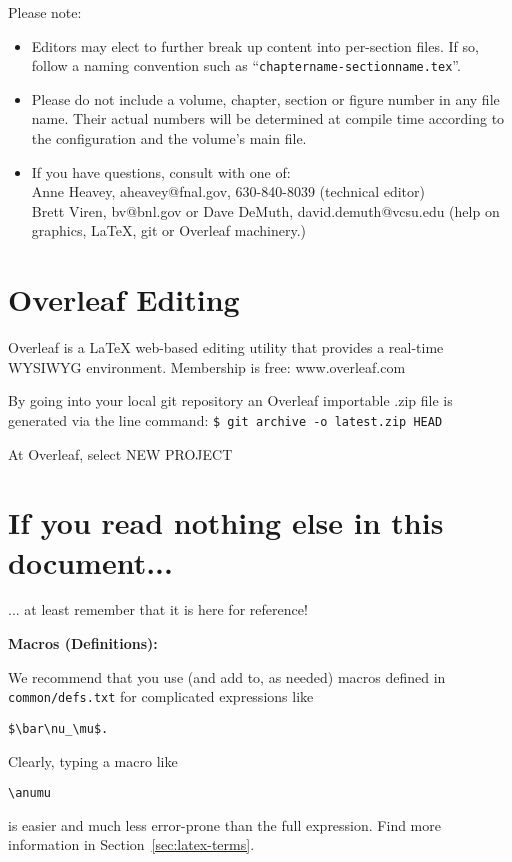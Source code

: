 Please note:
\begin{itemize}
\item Editors may elect to further break up content into per-section files. If so, follow a naming convention such as ``\texttt{chaptername-sectionname.tex}''.
\item Please do not include a volume, chapter, section or figure number in any file name. Their actual numbers will be determined at compile time according to the configuration and the volume's main file. 
\item If you have questions, consult with one of: \\
  Anne Heavey, aheavey@fnal.gov, 630-840-8039 (technical editor)\\
  Brett Viren, bv@bnl.gov or Dave DeMuth, david.demuth@vcsu.edu (help on graphics, \LaTeX{}, git or Overleaf machinery.)
\end{itemize}

\section{Overleaf Editing}
\label{sec:gen-overleaf}

Overleaf is a \LaTeX{} web-based editing utility that provides a real-time WYSIWYG environment. Membership is free: www.overleaf.com

By going into your local git repository an Overleaf importable .zip file is generated via the line command: \texttt{\$ git archive -o latest.zip HEAD}

At Overleaf, select NEW PROJECT

\section{If you read nothing else in this document...}
\label{sec:gen-nothing}

... at least remember that it is here for reference!

\textbf{Macros (Definitions):}

\begin{framed}
We recommend that you use (and add to, as needed) macros defined in \texttt{common/defs.txt} for complicated expressions like 
\begin{verbatim}
$\bar\nu_\mu$.
\end{verbatim}
 Clearly, typing a macro like 
 \begin{verbatim}
\anumu
\end{verbatim} 
is easier and much less error-prone than the full expression.
Find more information in Section~\ref{sec:latex-terms}.
\end{framed}


